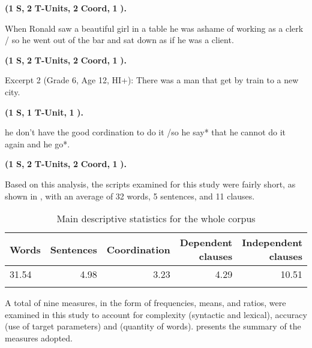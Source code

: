 \documentclass[output=paper]{langsci/langscibook}
\begin{document}
  \textbf{(1} \textbf{S,} \textbf{2} \textbf{T-Units,} \textbf{2} \textbf{Coord,} \textbf{1} \textbf{).} 

  \ex When Ronald saw a beautiful girl in a table he was ashame of working as a clerk / so he went out of the bar and sat down as if he was a client. 

  \textbf{(1} \textbf{S,} \textbf{2} \textbf{T-Units,} \textbf{2} \textbf{Coord,} \textbf{1} \textbf{).}
  \z
\z

\newpage 
\ea Excerpt 2 (Grade 6, Age 12, HI+): 
  \ea There was a man that get by train to a new city. 

  \textbf{(1} \textbf{S,} \textbf{1} \textbf{T-Unit,} \textbf{1} \textbf{).}

  \ex he don't have the good cordination to do it /so he say* that he cannot do it again and he go*. 

  \textbf{(1} \textbf{S,} \textbf{2} \textbf{T-Units,} \textbf{2} \textbf{Coord,} \textbf{1} \textbf{).} 
  \z
\z

Based on this analysis, the scripts examined for this study were fairly short, as shown in , with an average of 32 words, 5 sentences, and 11 clauses. 

\begin{table}
\small
\begin{tabularx}{\textwidth}{Xrrrr}
\lsptoprule
\bfseries Words & \bfseries Sentences & \bfseries Coordination & \bfseries Dependent clauses & \bfseries Independent clauses\\
\midrule
31.54 & 4.98 & 3.23 & 4.29 & 10.51\\
\lspbottomrule
\end{tabularx}
\caption{Main descriptive statistics for the whole corpus}
\label{tab:tejada:3}
\end{table}


A total of nine measures, in the form of frequencies, means, and ratios, were examined in this study to account for complexity (syntactic and lexical), accuracy (use of  target parameters) and  (quantity of words).  presents the summary of the measures adopted. 
\end{document}
